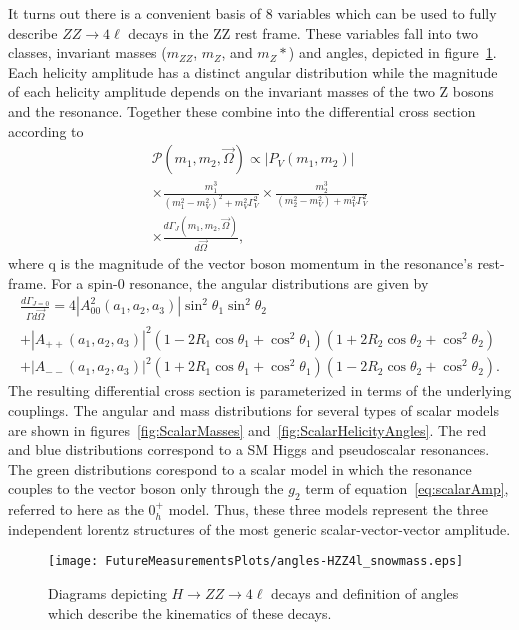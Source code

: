 It turns out there is a convenient basis of 8 variables which can be
used to fully describe $ZZ\to4\ell$ decays in the ZZ rest frame.  These
variables fall into two classes, invariant masses ($m_{ZZ}$, $m_Z$, and 
$m_Z*$) and angles, depicted in figure~\ref{fig:HZZdiagram}.
Each helicity amplitude has a distinct angular distribution while the
magnitude of each helicity amplitude depends on the invariant masses 
of the two Z bosons and the resonance.  Together these combine into the
differential cross section according to
\begin{equation}
\begin{split}
\mathscr{P}(m_1,m_2,\vec{\Omega})\propto|P_V(m_1,m_2)|  \\
\times\frac{m_1^3}{(m_1^2-m_V^2)^2+m_V^2\Gamma_V^2}\times\frac{m_2^3}{(m_2^2-m_V^2)+m_V^2\Gamma_V^2} \\
\times\frac{d\Gamma_J(m_1,m_2,\vec{\Omega})}{d\vec{\Omega}},
\end{split}
\end{equation}
where q is the magnitude of the vector boson momentum in the resonance's rest-frame.
For a spin-0 resonance, the angular distributions are given 
by
\begin{equation}
\begin{split}
\frac{d\Gamma_{J=0}}{\Gamma d\vec{\Omega}} = 4|A_{00}^2(a_1,a_2,a_3)|\sin^2\theta_1\sin^2\theta_2 \\
+|A_{++}(a_1,a_2,a_3)|^2(1-2R_1\cos\theta_1+\cos^2\theta_1)(1+2R_{2}\cos\theta_2+\cos^2\theta_2)\\
+|A_{--}(a_1,a_2,a_3)|^2(1+2R_1\cos\theta_1+\cos^2\theta_1)(1-2R_{2}\cos\theta_2+\cos^2\theta_2).  
\end{split}
\label{eq:angularDist}
\end{equation}
The resulting differential cross section is parameterized in terms of 
the underlying couplings. 
The angular and mass distributions for several types of scalar 
models are shown in figures~\ref{fig:ScalarMasses} 
and~\ref{fig:ScalarHelicityAngles}.  The red and blue distributions
correspond to a SM Higgs and pseudoscalar resonances.  The green 
distributions corespond to a scalar model in which the resonance couples
to the vector boson only through the $g_2$ term of 
equation~\ref{eq:scalarAmp}, referred to here as
the $0_{h}^+$ model.  Thus, these three models 
represent the three independent lorentz structures of the most generic
scalar-vector-vector amplitude.  

\begin{figure}
\begin{center}
\texttt{[image: FutureMeasurementsPlots/angles-HZZ4l\_snowmass.eps]}
\caption{Diagrams depicting $H\to ZZ\to4\ell$ decays and definition
of angles which describe the kinematics of these decays.}
\label{fig:HZZdiagram}
\end{center}
\end{figure}

